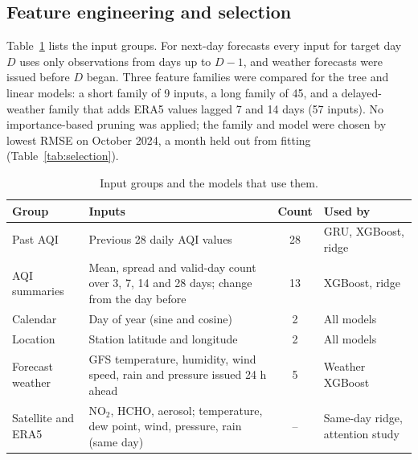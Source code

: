 \documentclass[pdflatex,sn-mathphys-num]{sn-jnl}
\begin{document}
\subsection{Feature engineering and selection}
Table~\ref{tab:features} lists the input groups. For next-day forecasts every input for target day $D$ uses only observations from days up to $D-1$, and weather forecasts were issued before $D$ began. Three feature families were compared for the tree and linear models: a short family of 9 inputs, a long family of 45, and a delayed-weather family that adds ERA5 values lagged 7 and 14 days (57 inputs). No importance-based pruning was applied; the family and model were chosen by lowest RMSE on October 2024, a month held out from fitting (Table~\ref{tab:selection}).

\begin{table}[!htbp]
\centering
\small
\caption{Input groups and the models that use them.}\label{tab:features}
\begin{tabular}{lp{5.6cm}cl}
\toprule
\textbf{Group} & \textbf{Inputs} & \textbf{Count} & \textbf{Used by} \\
\midrule
Past AQI & Previous 28 daily AQI values & 28 & GRU, XGBoost, ridge \\
AQI summaries & Mean, spread and valid-day count over 3, 7, 14 and 28 days; change from the day before & 13 & XGBoost, ridge \\
Calendar & Day of year (sine and cosine) & 2 & All models \\
Location & Station latitude and longitude & 2 & All models \\
Forecast weather & GFS temperature, humidity, wind speed, rain and pressure issued 24 h ahead & 5 & Weather XGBoost \\
Satellite and ERA5 & NO$_2$, HCHO, aerosol; temperature, dew point, wind, pressure, rain (same day) & -- & Same-day ridge, attention study \\
\bottomrule
\end{tabular}
\end{table}
\end{document}
